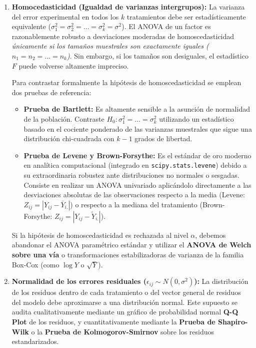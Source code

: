 \begin{enumerate}
	\item \textbf{Homocedasticidad (Igualdad de varianzas intergrupos):} La varianza del error experimental en todos los $k$ tratamientos debe ser estadísticamente equivalente ($\sigma_1^2 = \sigma_2^2 = \ldots = \sigma_k^2 = \sigma^2$). El ANOVA de un factor es razonablemente robusto a desviaciones moderadas de homoscedasticidad \emph{únicamente si los tamaños muestrales son exactamente iguales ($n_1 = n_2 = \ldots = n_k$)}. Sin embargo, si los tamaños son desiguales, el estadístico $F$ puede volverse altamente impreciso.

	Para contrastar formalmente la hipótesis de homoscedasticidad se emplean dos pruebas de referencia:
	\begin{itemize}
		\item \textbf{Prueba de Bartlett:} Es altamente sensible a la asunción de normalidad de la población. Contraste $H_0: \sigma_1^2 = \ldots = \sigma_k^2$ utilizando un estadístico basado en el cociente ponderado de las varianzas muestrales que sigue una distribución chi-cuadrada con $k-1$ grados de libertad.
		\item \textbf{Prueba de Levene y Brown-Forsythe:} Es el estándar de oro moderno en analítica computacional (integrado en \texttt{scipy.stats.levene}) debido a su extraordinaria robustez ante distribuciones no normales o sesgadas. Consiste en realizar un ANOVA univariado aplicándolo directamente a las desviaciones absolutas de las observaciones respecto a la media (Levene: $Z_{ij} = |Y_{ij} - \bar{Y}_{i.}|$) o respecto a la mediana del tratamiento (Brown-Forsythe: $Z_{ij} = |Y_{ij} - \tilde{Y}_{i.}|$).
	\end{itemize}
	Si la hipótesis de homoscedasticidad es rechazada al nivel $\alpha$, debemos abandonar el ANOVA paramétrico estándar y utilizar el \textbf{ANOVA de Welch sobre una vía} o transformaciones estabilizadoras de varianza de la familia Box-Cox (como $\log Y$ o $\sqrt{Y}$).

	\item \textbf{Normalidad de los errores residuales ($\epsilon_{ij} \sim N(0,\sigma^2)$):} La distribución de los residuos dentro de cada tratamiento o del vector general de residuos del modelo debe aproximarse a una distribución normal. Este supuesto se audita cualitativamente mediante un gráfico de probabilidad normal \textbf{Q-Q Plot} de los residuos, y cuantitativamente mediante la \textbf{Prueba de Shapiro-Wilk} o la \textbf{Prueba de Kolmogorov-Smirnov} sobre los residuos estandarizados.


\end{enumerate}

